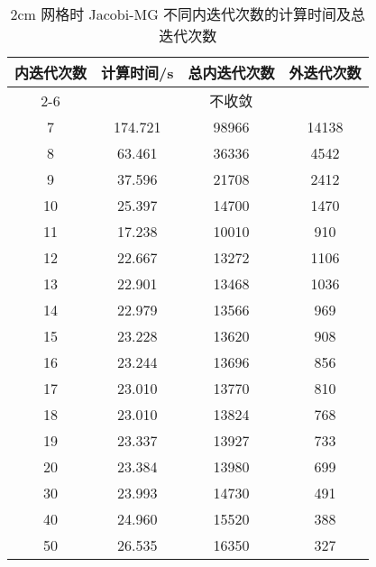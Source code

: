 \begin{datasheet}
\begin{table}
\centering
\caption{2cm 网格时 Jacobi-MG 不同内迭代次数的计算时间及总迭代次数}
\label{tab:equsolve.iter.jacobi-mg.2cm}
\begin{tabular}{cccc}
\toprule
内迭代次数 & 计算时间/s & 总内迭代次数 & 外迭代次数\\
\midrule
2-6 & \multicolumn{3}{c}{不收敛} \\ %
7 & 174.721 & 98966 & 14138\\
8 & 63.461 & 36336 & 4542\\
9 & 37.596 & 21708 & 2412\\
10 & 25.397 & 14700 & 1470\\
11 & 17.238 & 10010 & 910\\
12 & 22.667 & 13272 & 1106\\
13 & 22.901 & 13468 & 1036\\
14 & 22.979 & 13566 & 969\\
15 & 23.228 & 13620 & 908\\
16 & 23.244 & 13696 & 856\\
17 & 23.010 & 13770 & 810\\
18 & 23.010 & 13824 & 768\\
19 & 23.337 & 13927 & 733\\
20 & 23.384 & 13980 & 699\\
30 & 23.993 & 14730 & 491\\
40 & 24.960 & 15520 & 388\\
50 & 26.535 & 16350 & 327\\
\bottomrule
\end{tabular}
\end{table}



\end{datasheet}
